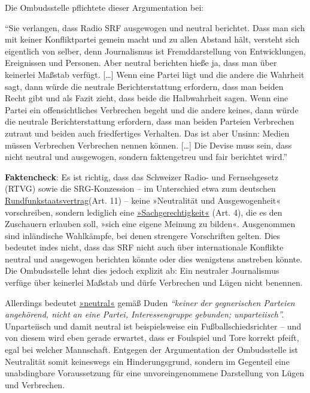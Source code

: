 Die Ombudsstelle pflichtete dieser Argumentation bei:

``Sie verlangen, dass Radio SRF ausgewogen und neutral berichtet. Dass
man sich mit keiner Konfliktpartei gemein macht und zu allen Abstand
hält, versteht sich eigentlich von selber, denn Journalismus ist
Fremddarstellung von Entwicklungen, Ereignissen und Personen. Aber
neutral berichten hieße ja, dass man über keinerlei Maßstab verfügt.
{[}\ldots{}{]} Wenn eine Partei lügt und die andere die Wahrheit sagt,
dann würde die neutrale Berichterstattung erfordern, dass man beiden
Recht gibt und als Fazit zieht, dass beide die Halbwahrheit sagen. Wenn
eine Partei ein offensichtliches Verbrechen begeht und die andere
keines, dann würde die neutrale Berichterstattung erfordern, dass man
beiden Parteien Verbrechen zutraut und beiden auch friedfertiges
Verhalten. Das ist aber Unsinn: Medien müssen Verbrechen Verbrechen
nennen können. {[}\ldots{}{]} Die Devise muss sein, dass nicht neutral
und ausgewogen, sondern faktengetreu und fair berichtet wird.''

\textbf{Faktencheck}: Es ist richtig, dass das Schweizer Radio- und
Fernsehgesetz (RTVG) sowie die SRG-Konzession -- im Unterschied etwa zum
deutschen
\href{http://www.die-medienanstalten.de/fileadmin/Download/Rechtsgrundlagen/Gesetze_aktuell/19_RfAendStV_medienanstalten_Layout_final.pdf}{Rundfunkstaatsvertrag}(Art.
11) -- keine »Neutralität und Ausgewogenheit« vorschreiben, sondern
lediglich eine
\href{https://www.admin.ch/opc/de/classified-compilation/20001794/index.html}{»Sachgerechtigkeit«}
(Art. 4), die es den Zuschauern erlauben soll, »sich eine eigene Meinung
zu bilden«. Ausgenommen sind inländische Wahlkämpfe, bei denen strengere
Vorschriften gelten. Dies bedeutet indes nicht, dass das SRF nicht auch
über internationale Konflikte neutral und ausgewogen berichten könnte
oder dies wenigstens anstreben könnte. Die Ombudsstelle lehnt dies
jedoch explizit ab: Ein neutraler Journalismus verfüge über keinerlei
Maßstab und dürfe Verbrechen und Lügen nicht benennen.

Allerdings bedeutet
\href{http://www.duden.de/rechtschreibung/neutral}{»neutral«} gemäß
Duden \emph{``keiner der gegnerischen Parteien angehörend, nicht an eine
Partei, Interessengruppe gebunden; unparteiisch''.} Unparteiisch und
damit neutral ist beispielsweise ein Fußballschiedsrichter -- und von
diesem wird eben gerade erwartet, dass er Foulspiel und Tore korrekt
pfeift, egal bei welcher Mannschaft. Entgegen der Argumentation der
Ombudsstelle ist Neutralität somit keineswegs ein Hinderungsgrund,
sondern im Gegenteil eine unabdingbare Voraussetzung für eine
unvoreingenommene Darstellung von Lügen und Verbrechen.

